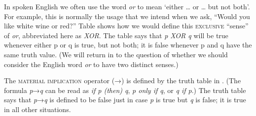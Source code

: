 In spoken English we often use the word \textit{or} to mean ‘either … or … but not both’. For example, this is normally the usage that we intend when we ask, “Would you like white wine or red?” Table  shows how we would define this \textsc{exclusive} “sense” of \textit{or}, abbreviated here as \textit{XOR}. The table says that \textit{p XOR q} will be true whenever either p or q is true, but not both; it is false whenever p and q have the same truth value. (We will return in  to the question of whether we should consider the English word \textit{or} to have two distinct senses.)



The \textsc{material} \textsc{implication} operator (→) is defined by the truth table in . (The formula \textit{p}→\textit{q} can be read as \textit{if p (then) q}, \textit{p only if q}, or \textit{q if p}.) The truth table says that \textit{p}→\textit{q} is defined to be false just in case \textit{p} is true but \textit{q} is false; it is true in all other situations.



